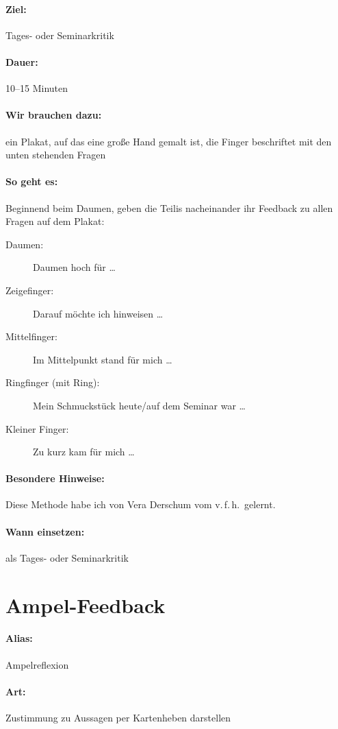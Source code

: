 \paragraph{Ziel:} Tages- oder Seminarkritik
\paragraph{Dauer:} 10--15 Minuten
\paragraph{Wir brauchen dazu:} ein Plakat, auf das eine große Hand gemalt ist, die Finger beschriftet mit den unten stehenden Fragen
\paragraph{So geht es:} Beginnend beim Daumen, geben die Teilis nacheinander ihr Feedback zu allen Fragen auf dem Plakat:
  \begin{description}
    \item[Daumen:] Daumen hoch für \ldots
    \item[Zeigefinger:] Darauf möchte ich hinweisen \ldots
    \item[Mittelfinger:] Im Mittelpunkt stand für mich \ldots
    \item[Ringfinger (mit Ring):] Mein Schmuckstück heute/auf dem Seminar war \ldots
    \item[Kleiner Finger:] Zu kurz kam für mich \ldots
  \end{description}
\paragraph{Besondere Hinweise:} Diese Methode habe ich von Vera Derschum vom v.\,f.\,h.~gelernt.
\paragraph{Wann einsetzen:} als Tages- oder Seminarkritik

\section{Ampel-Feedback}
\paragraph{Alias:} Ampelreflexion
\paragraph{Art:} Zustimmung zu Aussagen per Kartenheben darstellen
